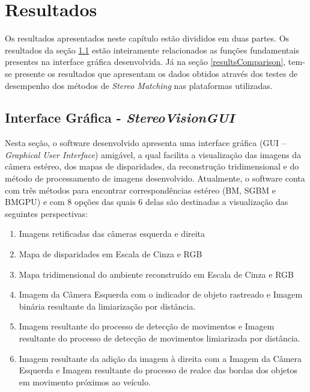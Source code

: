 \chapter{Resultados}
\label{Resultados}

Os resultados apresentados neste capítulo estão divididos em duas partes. Os resultados da seção \ref{resultsGUI} estão inteiramente relacionados as funções fundamentais presentes na interface gráfica desenvolvida. Já na seção \ref{resultsComparison}, tem-se presente os resultados que apresentam os dados obtidos através dos testes de desempenho dos métodos de \textit{Stereo Matching} nas plataformas utilizadas.

\section{Interface Gráfica - \textit{StereoVisionGUI}}
\label{resultsGUI}

Nesta seção, o software desenvolvido apresenta uma interface gráfica (GUI -- \textit{Graphical User Interface}) amigável, a qual facilita a visualização das imagens da câmera estéreo, 
dos mapas de disparidades, da reconstrução tridimensional e do método de processamento de imagens desenvolvido. Atualmente, o software conta com três métodos para encontrar correspondências 
estéreo (BM, SGBM e BMGPU) e com 8 opções das quais 6 delas são destinadas a visualização das seguintes perspectivas:

\begin{enumerate}
  \item Imagens retificadas das câmeras esquerda e direita
  \item Mapa de disparidades em Escala de Cinza e RGB
  \item Mapa tridimensional do ambiente reconstruído em Escala de Cinza e RGB
  \item Imagem da Câmera Esquerda com o indicador de objeto rastreado e Imagem binária resultante da limiarização por distância.
  \item Imagem resultante do processo de detecção de movimentos e Imagem resultante do processo de detecção de movimentos limiarizada por distância. 
  \item Imagem resultante da adição da imagem à direita com a Imagem da Câmera Esquerda e Imagem resultante do processo de realce das bordas dos objetos em movimento próximos ao veículo.
\end{enumerate} 

